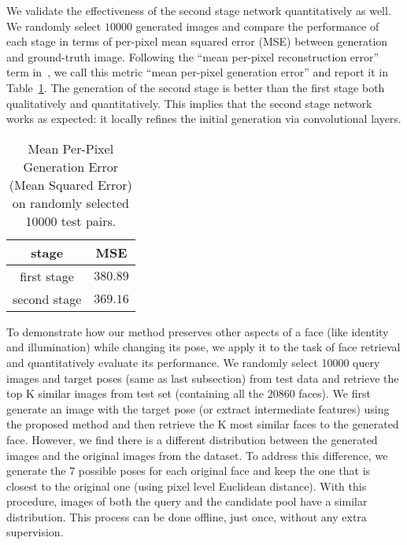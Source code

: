 \documentclass[10pt,twocolumn,letterpaper]{article}
\begin{document}
We validate the effectiveness of the second stage network quantitatively as well. We randomly select $10000$ generated images and compare the performance of each stage in terms of per-pixel mean squared error (MSE) between generation and ground-truth image. Following the ``mean per-pixel reconstruction error'' term in~\cite{turmukhambetov2015modeling}, we call this metric ``mean per-pixel generation error'' and report it in Table~\ref{table:2stage_MSE_performance}. %
The generation of the second stage is better than the first stage both qualitatively and quantitatively.
This implies that the second stage network works as expected: it locally refines the initial generation via convolutional layers.

\begin{table}
\begin{center}{\small
{
\begin{tabular}{|c|c|}
\hline
stage & MSE \\
\hline\hline
{first stage}	&	$380.89$ \\
{second stage}	&	$369.16$ \\
\hline
\end{tabular}
}
}
\end{center}
\caption{Mean Per-Pixel Generation Error (Mean Squared Error) on randomly selected 10000 test pairs.}
\label{table:2stage_MSE_performance}
\end{table}%
To demonstrate how our method preserves other aspects of a face (like identity and illumination) while changing its pose, we apply it to the task of face retrieval and quantitatively evaluate its performance. 
We randomly select 10000 query images and target poses (same as last subsection) from test data and retrieve the top K similar images from test set (containing all the $20860$ faces). 
We first generate an image with the target pose (or extract intermediate features) using the proposed method and then retrieve the K most similar faces to the generated face. However, we find there is a different distribution between the generated images and the original images from the dataset. To address this difference, we generate the 7 possible poses for each original face and keep the one that is closest to the original one (using pixel level Euclidean distance). With this procedure, images of both the query and the candidate pool have a similar distribution. This process can be done offline, just once, without any extra supervision. 
\end{document}
